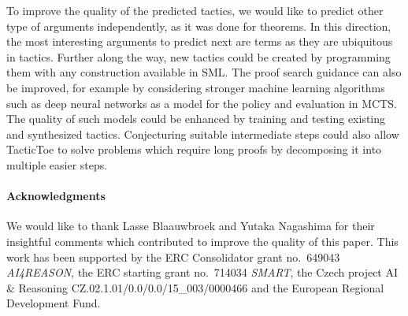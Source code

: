 \documentclass[runningheads,a4paper,draft]{svjour3}
\def\sml{\textsf{SML}\xspace}
\def\tactictoe{\textsf{TacticToe}\xspace}
\begin{document}
To improve the quality of the predicted tactics,
we would like to predict other type of arguments independently, as it was done
for theorems. In this direction, the most interesting arguments to
predict next are terms as they are ubiquitous in tactics. Further along the way,
new tactics could be created by programming them with any construction
available in \sml.
The proof search guidance can also be improved, for example by considering
stronger machine learning algorithms
such as deep neural networks as a model for the policy and evaluation in MCTS.
The quality of such models could be enhanced by
training and testing existing and synthesized tactics.
Conjecturing suitable intermediate steps could also allow \tactictoe to solve
problems which require long proofs by decomposing it into multiple easier
steps.

\paragraph{Acknowledgments}\label{sect:acks}
We would like to thank Lasse Blaauwbroek and Yutaka Nagashima for their
insightful comments which
contributed to improve the quality of this paper. This work has been supported
by the ERC Consolidator grant no.\ 649043 \textit{AI4REASON}, the ERC starting
grant no.\ 714034 \textit{SMART}, the Czech
project AI \& Reasoning CZ.02.1.01/0.0/0.0/15\_003/0000466 and the
European Regional Development Fund.



\end{document}

